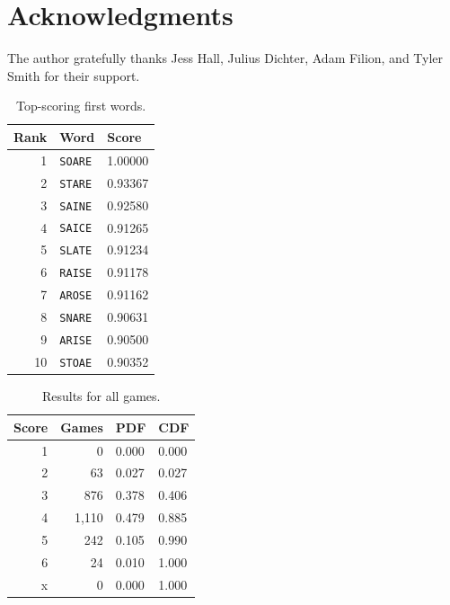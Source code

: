 \documentclass[twocolumn]{tudelft-aiaa}
\begin{document}
\section{Acknowledgments}

The author gratefully thanks Jess Hall, Julius Dichter, Adam Filion, and Tyler Smith for their support.

\begin{table}[h!]
\begin{centering}
\begin{tabular}{ r | l | l}
\bf Rank & \bf Word & \bf Score\\
\hline
1  & \texttt{SOARE} & 1.00000\\
2  & \texttt{STARE} & 0.93367\\
3  & \texttt{SAINE} & 0.92580\\
4  & \texttt{SAICE} & 0.91265\\
5  & \texttt{SLATE} & 0.91234\\
6  & \texttt{RAISE} & 0.91178\\
7  & \texttt{AROSE} & 0.91162\\
8  & \texttt{SNARE} & 0.90631\\
9  & \texttt{ARISE} & 0.90500\\
10 & \texttt{STOAE} & 0.90352\\
\end{tabular}
\vspace{2 mm}
\caption{Top-scoring first words.}
\label{table_words}
\end{centering}
\end{table}

\begin{table}[h!]
\begin{centering}
\begin{tabular}{ r | r | l | l}
\bf Score & \bf Games & \bf PDF & \bf CDF\\
\hline
1 & 0 & 0.000 & 0.000\\
2 & 63 & 0.027 & 0.027\\
3 & 876 & 0.378 & 0.406\\
4 & 1,110 & 0.479 & 0.885\\
5 & 242 & 0.105 & 0.990\\
6 & 24 & 0.010 & 1.000\\
x & 0 & 0.000 & 1.000\\
\end{tabular}
\vspace{2 mm}
\caption{Results for all games.}
\label{table_results}
\end{centering}
\end{table}
\end{document}
